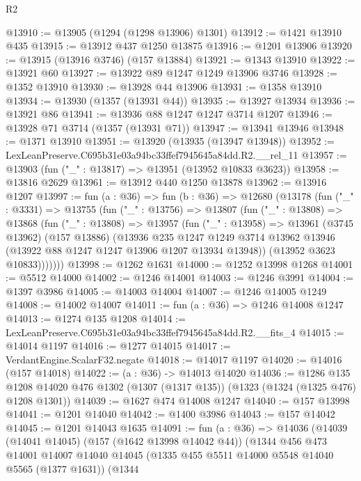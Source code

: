 \begin{lexlean}{R2}
\begin{coremodule}
@13910 := @13905 (@1294 (@1298 @13906) @1301)
@13912 := @1421 @13910 @435
@13915 := @13912 @437 @1250 @13875
@13916 := @1201 @13906
@13920 := @13915 (@13916 @3746) (@157 @13884)
@13921 := @1343 @13910
@13922 := @13921 @60
@13927 := @13922 @89 @1247 @1249 @13906 @3746
@13928 := @1352 @13910
@13930 := @13928 @44 @13906
@13931 := @1358 @13910
@13934 := @13930 (@1357 (@13931 @44))
@13935 := @13927 @13934
@13936 := @13921 @86
@13941 := @13936 @88 @1247 @1247 @3714 @1207
@13946 := @13928 @71 @3714 (@1357 (@13931 @71))
@13947 := @13941 @13946
@13948 := @1371 @13910
@13951 := @13920 (@13935 (@13947 @13948))
@13952 := LexLeanPreserve.C695b31e03a94bc33ffef7945645a84dd.R2.__rel_11
@13957 := @13903 (fun ("_" : @13817) => @13951 (@13952 @10833 @3623))
@13958 := @13816 @2629
@13961 := @13912 @440 @1250 @13878
@13962 := @13916 @1207
@13997 := fun (a : @36) =>
  fun (b : @36) =>
  @12680
    (@13178
      (fun ("_" : @3331) =>
      @13755
        (fun ("_" : @13756) =>
        @13807
          (fun ("_" : @13808) =>
          @13868
            (fun ("_" : @13808) =>
            @13957
              (fun ("_" : @13958) =>
              @13961
                (@3745 @13962)
                (@157 @13886)
                (@13936
                  @235
                  @1247
                  @1249
                  @3714
                  @13962
                  @13946
                  (@13922 @88 @1247 @1247 @13906 @1207 @13934 @13948))
                (@13952 @3623 @10833)))))))
@13998 := @1262 @1631
@14000 := @1252 @13998 @1268
@14001 := @5512 @14000
@14002 := @1246 @14001
@14003 := @1246 @3991
@14004 := @1397 @3986
@14005 := @14003 @14004
@14007 := @1246 @14005 @1249
@14008 := @14002 @14007
@14011 := fun (a : @36) => @1246 @14008 @1247
@14013 := @1274 @135 @1208
@14014 := LexLeanPreserve.C695b31e03a94bc33ffef7945645a84dd.R2.__fits_4
@14015 := @14014 @1197
@14016 := @1277 @14015
@14017 := VerdantEngine.ScalarF32.negate
@14018 := @14017 @1197
@14020 := @14016 (@157 @14018)
@14022 := (a : @36) -> @14013 @14020
@14036 := @1286
    @135
    @1208
    @14020
    @476
    @1302
    (@1307 (@1317 @135))
    (@1323 (@1324 (@1325 @476) @1208 @1301))
@14039 := @1627 @474 @14008 @1247
@14040 := @157 @13998
@14041 := @1201 @14040
@14042 := @1400 @3986
@14043 := @157 @14042
@14045 := @1201 @14043 @1635
@14091 := fun (a : @36) =>
  @14036
    (@14039
      (@14041 @14045)
      (@157 (@1642 @13998 @14042 @44))
      (@1344
        @456
        @473
        @14001
        @14007
        @14040
        @14045
        (@1335 @455 @5511 @14000 @5548 @14040 @5565 (@1377 @1631))
        (@1344

\end{coremodule}
\end{lexlean}
